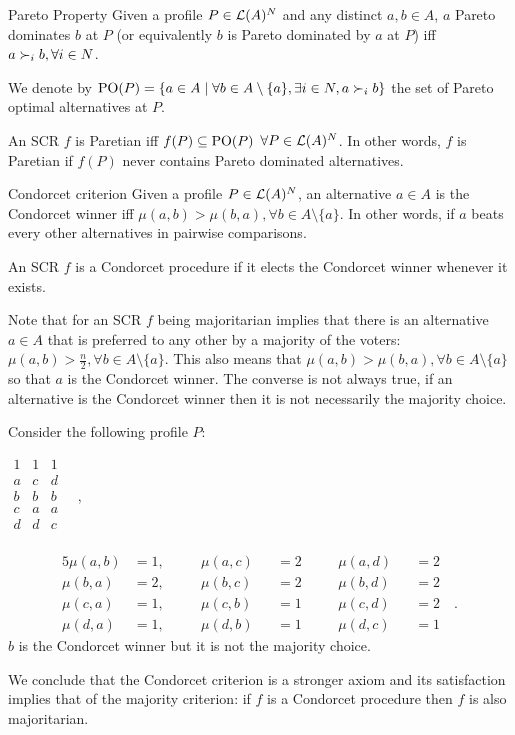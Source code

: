 	\begin{genthm}{Pareto Property}
	Given a profile $P\in\mathcal{L}(A)^{N}$ and any distinct $a,b\in A$, $a$ Pareto dominates $b$ at $P$ (or equivalently $b$ is Pareto dominated by $a$ at $P$) iff $a \prefi b,\forall i\in N$.
	
	We denote by $\paretopt(P)= \set{a \in A \suchthat \forall b \in A\setminus\{a\}, \exists i \in N, a \pref_i b}$ the set of Pareto optimal alternatives at $P$.
	
	An \acs{SCR} $f$ is Paretian iff $f(P)\subseteq\text{PO}(P)$ $\forall P\in\mathcal{L}(A)^{N}$. In other words, $f$ is Paretian if $f(P)$ never contains Pareto dominated alternatives.	
	\end{genthm} 
	
	\begin{genthm}{Condorcet criterion}
	Given a profile $P\in\mathcal{L}(A)^{N}$, an alternative $a\in A$ is the Condorcet winner iff $\mu(a,b)> \mu(b,a), \forall b\in{A\setminus{\{a\}}}$. In other words, if $a$ beats every other alternatives in pairwise comparisons.
	
	An \acs{SCR} $f$ is a Condorcet procedure if it elects the Condorcet winner whenever it exists.	
	\end{genthm}

	Note that for an \acs{SCR} $f$ being majoritarian implies that there is an alternative $a \in A$ that is preferred to any other by a majority of the voters: $\mu(a,b)> \frac{n}{2}, \forall b\in{A\setminus{\{a\}}}$. This also means that $\mu(a,b)> \mu(b,a), \forall b\in{A\setminus{\{a\}}}$ so that $a$ is the Condorcet winner.
	The converse is not always true, if an alternative is the Condorcet winner then it is not necessarily the majority choice.
	\begin{example}
		\label{ex:condorcetMaj}
		Consider the following profile $P$:
		\begin{center}
			$
			\begin{array}{ccc}
				1 & 1 & 1 \\
				a &	c & d \\
				b &	b & b \\
				c &	a & a \\
				d & d & c \\
			\end{array} \quad, 
			$
		\end{center}
		\begin{alignat*}{5}
			\mu(a,b)&=1, \quad && \mu(a,c)&&=2  \quad && \mu(a,d)&&=2 \\ 
			\mu(b,a)&=2, \quad && \mu(b,c)&&=2  \quad && \mu(b,d)&&=2  \\
			\mu(c,a)&=1, \quad && \mu(c,b)&&=1  \quad && \mu(c,d)&&=2  \quad.\\
			\mu(d,a)&=1, \quad && \mu(d,b)&&=1  \quad && \mu(d,c)&&=1 
		\end{alignat*}
		$b$ is the Condorcet winner but it is not the majority choice.
	\end{example}
	We conclude that the Condorcet criterion is a stronger axiom and its satisfaction implies that of the majority criterion: if $f$ is a Condorcet procedure then $f$ is also majoritarian. 
	
